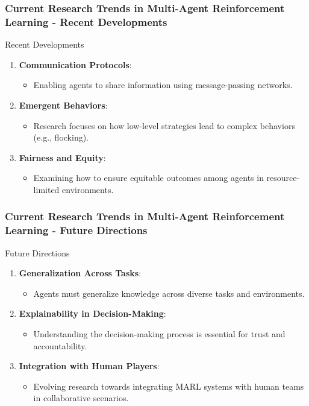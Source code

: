 \documentclass[aspectratio=169]{beamer}
\begin{document}
\begin{frame}[fragile]
    \frametitle{Current Research Trends in Multi-Agent Reinforcement Learning - Recent Developments}
    \begin{block}{Recent Developments}
        \begin{enumerate}
            \item \textbf{Communication Protocols}:
            \begin{itemize}
                \item Enabling agents to share information using message-passing networks.
            \end{itemize}
            \item \textbf{Emergent Behaviors}:
            \begin{itemize}
                \item Research focuses on how low-level strategies lead to complex behaviors (e.g., flocking).
            \end{itemize}
            \item \textbf{Fairness and Equity}:
            \begin{itemize}
                \item Examining how to ensure equitable outcomes among agents in resource-limited environments.
            \end{itemize}
        \end{enumerate}
    \end{block}
\end{frame}

\begin{frame}[fragile]
    \frametitle{Current Research Trends in Multi-Agent Reinforcement Learning - Future Directions}
    \begin{block}{Future Directions}
        \begin{enumerate}
            \item \textbf{Generalization Across Tasks}:
            \begin{itemize}
                \item Agents must generalize knowledge across diverse tasks and environments.
            \end{itemize}
            \item \textbf{Explainability in Decision-Making}:
            \begin{itemize}
                \item Understanding the decision-making process is essential for trust and accountability.
            \end{itemize}
            \item \textbf{Integration with Human Players}:
            \begin{itemize}
                \item Evolving research towards integrating MARL systems with human teams in collaborative scenarios.
            \end{itemize}
        \end{enumerate}
    \end{block}
\end{frame}
\end{document}
